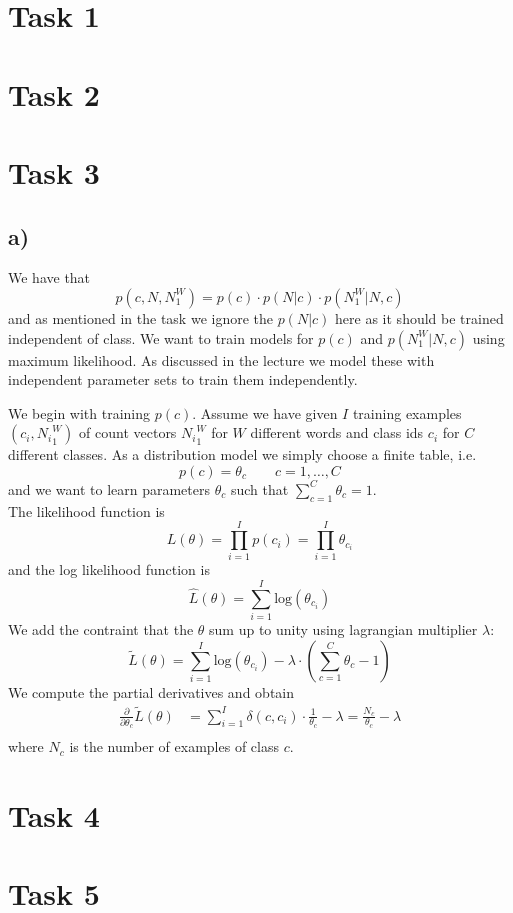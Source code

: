 \documentclass[%
   11pt,              %
   ngerman,           %
   a4paper,           %
   DIV11,             %
]{scrartcl}%
\begin{document}
\section*{Task 1}
\section*{Task 2}
\section*{Task 3}
\subsection*{a)}
We have that 
\begin{equation*}
	p(c, N, N_1^W) = p(c) \cdot p(N|c) \cdot p(N_1^W|N,c)
\end{equation*}
and as mentioned in the task we ignore the $p(N|c)$ here as it should be trained independent of class. We want to train models for $p(c)$ and $p(N_1^W|N,c)$ using maximum likelihood. As discussed in the lecture we model these with independent parameter sets to train them independently. \par
We begin with training $p(c)$. Assume we have given $I$ training examples $(c_i, {N_i}_1^W)$ of count vectors ${N_i}_1^W$ for $W$ different words and class ids $c_i$ for $C$ different classes. As a distribution model we simply choose a finite table, i.e.
\begin{equation*}
	p(c) = \theta_c \qquad c = 1,\ldots,C
\end{equation*} 
and we want to learn parameters $\theta_c$ such that $\sum_{c=1}^C \theta_c = 1$. \\
The likelihood function is 
\begin{equation*}
	L(\theta) = \prod_{i=1}^I p(c_i) = \prod_{i=1}^I \theta_{c_i}
\end{equation*}
and the log likelihood function is
\begin{equation*}
	\hat{L}(\theta) = \sum_{i=1}^I \text{log}(\theta_{c_i})
\end{equation*}
We add the contraint that the $\theta$ sum up to unity using lagrangian multiplier $\lambda$:
\begin{equation*}
	\tilde{L}(\theta) = \sum_{i=1}^I \text{log}(\theta_{c_i}) - \lambda \cdot (\sum_{c=1}^C \theta_c - 1)
\end{equation*}
We compute the partial derivatives and obtain
\begin{align*}
	\frac{\partial}{\partial \theta_c} \tilde{L}(\theta) &= \sum_{i=1}^I \delta(c,c_i) \cdot \frac{1}{\theta_c} - \lambda = \frac{N_c}{\theta_c} - \lambda \\
\end{align*}
where $N_c$ is the number of examples of class $c$.

\section*{Task 4}
\section*{Task 5}
\end{document}
